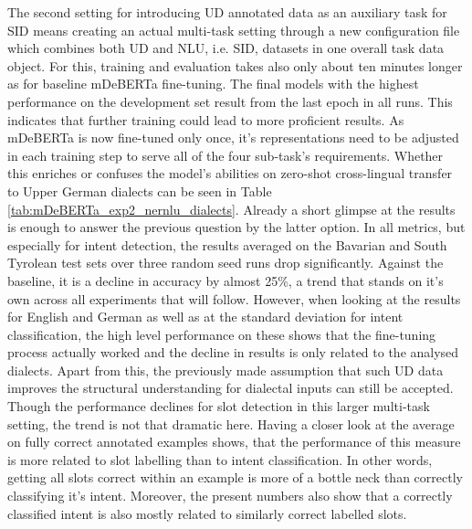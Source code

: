 \documentclass[11pt,a4paper,twoside,openright]{scrbook}
\begin{document}
The second setting for introducing UD annotated data as an auxiliary task for SID means creating an actual multi-task setting through a new configuration file which combines both UD and NLU, i.e. SID, datasets in one overall task data object. For this, training and evaluation takes also only about ten minutes longer as for baseline mDeBERTa fine-tuning. The final models with the highest performance on the development set result from the last epoch in all runs. This indicates that further training could lead to more proficient results. As mDeBERTa is now fine-tuned only once, it's representations need to be adjusted  in each training step to serve all of the four sub-task's requirements. Whether this enriches or confuses the model's abilities on zero-shot cross-lingual transfer to Upper German dialects can be seen in Table \ref{tab:mDeBERTa_exp2_nernlu_dialects}. Already a short glimpse at the results is enough to answer the previous question by the latter option. In all metrics, but especially for intent detection, the results averaged on the Bavarian and South Tyrolean test sets over three random seed runs drop significantly. Against the baseline, it is a decline in accuracy by almost 25\%, a trend that stands on it's own across all experiments that will follow. However, when looking at the results for English and German as well as at the standard deviation for intent classification, the high level performance on these shows that the fine-tuning process actually worked and the decline in results is only related to the analysed dialects. Apart from this, the previously made assumption that such UD data improves the structural understanding for dialectal inputs can still be accepted. Though the performance declines for slot detection in this larger multi-task setting, the trend is not that dramatic here. Having a closer look at the average on fully correct annotated examples shows, that the performance of this measure is more related to slot labelling than to intent classification. In other words, getting all slots correct within an example is more of a bottle neck than correctly classifying it's intent. Moreover, the present numbers also show that a correctly classified intent is also mostly related to similarly correct labelled slots.
\end{document}

